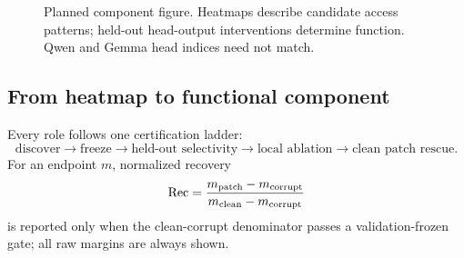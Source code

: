 \begin{figure}[H]
\centering
{}
\caption{Planned component figure. Heatmaps describe candidate access
patterns; held-out head-output interventions determine function. Qwen and
Gemma head indices need not match.}
\label{fig:head-todo}
\end{figure}

\subsection{From heatmap to functional component}

Every role follows one certification ladder:
\begin{equation}
  \text{discover}
  \longrightarrow
  \text{freeze}
  \longrightarrow
  \text{held-out selectivity}
  \longrightarrow
  \text{local ablation}
  \longrightarrow
  \text{clean patch rescue}.
\label{eq:head-ladder}
\end{equation}
For an endpoint \(m\), normalized recovery
\[
  \operatorname{Rec}=
  \frac{m_{\rm patch}-m_{\rm corrupt}}
       {m_{\rm clean}-m_{\rm corrupt}}
\]
is reported only when the clean-corrupt denominator passes a validation-frozen
gate; all raw margins are always shown.

